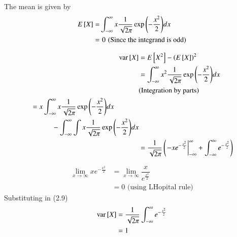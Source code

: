 \documentclass[journal,12pt,twocolumn]{IEEEtran}
\renewcommand\thesection{\arabic{section}}
\begin{document}
\begin{enumerate}[label=\thesection.\arabic*
,ref=\thesection.\theenumi]
\solution
The mean is given by
		\begin{align}
			E{}\left[X\right] =& \int_{-\infty}^{\infty}x\frac{1}{\sqrt{2\pi}}\exp{\ensuremath{\left(-\frac{x^2}{2}\right)}}dx\\
			=& \,\,0\,\,\text{(Since the integrand is odd)}
		\end{align}

		\begin{align}
			\text{var}{}\left[X\right] &= E{}\left[X^2\right] - \left(E{}\left[X\right]\right)^2 \\
			&=\int_{-\infty}^{\infty}x^2\frac{1}{\sqrt{2\pi}}\exp{\left(-\frac{x^2}{2}\right)}dx\\
			&\text{(Integration by parts)}\nonumber\\
			\begin{split}
			 &= x\int_{-\infty}^{\infty}x\frac{1}{\sqrt{2\pi}}\exp{\left(-\frac{x^2}{2}\right)}dx \\&\hspace{3em} -\int_{-\infty}^{\infty}\int x\frac{1}{\sqrt{2\pi}} \exp{\left(-\frac{x^2}{2}\right)}dx
			\end{split}\\
			&=\dfrac{1}{\sqrt{2\pi}}\left( \left.-xe^{-\frac{x^2}{2}}\right|_{-\infty}^{\infty} + \int_{-\infty}^{\infty} e^{-\frac{x^2}{2}}\right)
		\end{align}
	
		\begin{align}
			\lim\limits_{x\to\infty} xe^{-\tfrac{x^2}{2}} &= \lim\limits_{x\to\infty} \dfrac{x}{e^{\tfrac{x^2}{2}}}\\
			&= 0\text{ (using LHopital rule)}
		\end{align}
	Substituting in (2.9)\\
		\begin{align}
			\text{var}{}\left[X\right] &= \dfrac{1}{\sqrt{2\pi}} \int_{-\infty}^{\infty} e^{-\frac{x^2}{2}}\\
			&= 1
		\end{align}


\end{enumerate}
\end{document}
